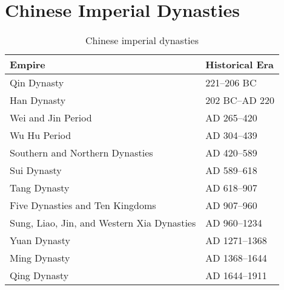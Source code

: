 \chapter{Chinese Imperial Dynasties}\label{chineseDynasties}
	
\linespread{1.2}	
	\begin{table}[h!]
	\centering
	\caption{Chinese imperial dynasties} \label{chineseDynasties}
	\begin{tabular}{ll}
	Empire&Historical Era\\
	\hline \hline
	Qin Dynasty &221--206 BC\\
	Han Dynasty &202 BC--AD 220\\
	Wei and Jin Period &AD 265--420\\
	Wu Hu Period &AD 304--439\\
	Southern and Northern Dynasties &AD 420--589\\
	Sui Dynasty &AD 589--618\\
	Tang Dynasty &AD 618--907\\
	Five Dynasties and Ten Kingdoms &AD 907--960\\
	Sung, Liao, Jin, and Western Xia Dynasties &AD 960--1234\\
	Yuan Dynasty &AD 1271--1368\\
	Ming Dynasty &AD 1368--1644\\
	Qing Dynasty &AD 1644--1911\\
	\hline
	\end{tabular}
	\end{table}
\linespread{1.9}	
